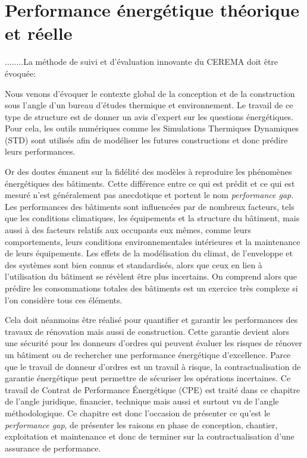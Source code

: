 \chapter{Performance énergétique théorique et réelle}

........La méthode de suivi et d'évaluation innovante du CEREMA doit être évoquée: %

Nous venons d'évoquer le contexte global de la conception et de la construction sous l'angle d'un bureau d'études thermique et environnement. Le travail de ce type de structure est de donner un avis d'expert sur les questions énergétiques. Pour cela, les outils numériques comme les Simulations Thermiques Dynamiques (STD) sont utilisés afin de modéliser les futures constructions et donc prédire leurs performances.

Or des doutes émanent sur la fidélité des modèles à reproduire les phénomènes énergétiques des bâtiments. Cette différence entre ce qui est prédit et ce qui est mesuré n'est généralement pas anecdotique et portent le nom \textit{performance gap}. Les performances des bâtiments sont influencées par de nombreux facteurs, tels que les conditions climatiques, les équipements et la structure du bâtiment, mais aussi à des facteurs relatifs aux occupants eux mêmes, comme leurs comportements, leurs conditions environnementales intérieures et la maintenance de leurs équipements. Les effets de la modélisation du climat, de l'enveloppe et des systèmes sont bien connus et standardisés, alors que ceux en lien à l'utilisation du bâtiment se révèlent être plus incertains. On comprend alors que prédire les consommations totales des bâtiments est un exercice très complexe si l'on considère tous ces éléments.

Cela doit néanmoins être réalisé pour quantifier et garantir les performances des travaux de rénovation mais aussi de construction. Cette garantie devient alors une sécurité pour les donneurs d'ordres qui peuvent évaluer les risques de rénover un bâtiment ou de rechercher une performance énergétique d'excellence. Parce que le travail de donneur d'ordres est un travail à risque, la contractualisation de garantie énergétique peut permettre de sécuriser les opérations incertaines. Ce travail de Contrat de Performance Énergétique (CPE) est traité dans ce chapitre de l'angle juridique, financier, technique mais aussi et surtout vu de l'angle méthodologique. Ce chapitre est donc l'occasion de présenter ce qu'est le \textit{performance gap}, de présenter les raisons en phase de conception, chantier, exploitation et maintenance et donc de terminer sur la contractualisation d'une assurance de performance.

